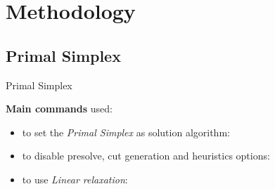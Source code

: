 \documentclass{beamer}
\begin{document}
	\section{Methodology}
	    
	    \subsection{Primal Simplex}
	    \begin{frame}{Primal Simplex}
        
        \textbf{Main commands} used:
        \begin{itemize}
            \item to set the \textit{Primal Simplex} as solution algorithm:
            \begin{center}
            \lstI
            \end{center}
            
        \item to disable presolve, cut generation and heuristics options:
        
        \lstII
        
        \item to use \textit{Linear relaxation}:
        
        \lstIII
        
        \end{itemize}
	    \end{frame}
	    
\end{document}
